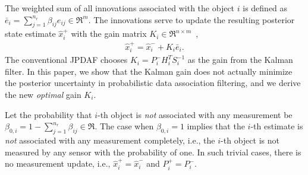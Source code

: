 The weighted sum of all innovations associated with the object $i$ is defined as ${\bar{e}}_{i}={\sum\limits_{j=1}^{n_r} \beta_{ij}e_{ij}}\in\Re^m$.
The innovations serve to update the resulting posterior state estimate $\hat x^+_{i}$ with the gain matrix $K_i\in\Re^{n\times m}$~\cite{TrackDataAssoc},
\begin{align}
\hat x^+_{i}= \hat x^-_{i}+K_{i}{\bar{e}}_{i}.\label{eqn:KalEst}
\end{align}
The conventional JPDAF chooses $K_i=P^-_iH_i^TS_i^{-1}$ as the gain from the Kalman filter.
In this paper, we show that the Kalman gain does not actually minimize the posterior uncertainty in probabilistic data association filtering, and we derive the new \textit{optimal} gain $K_i$.

Let the probability that $i$-th object is \textit{not} associated with any measurement be $\beta_{0,i}=1-{\sum_{j=1}^{n_r} \beta_{ij}}\in\Re$. The case when $\beta_{0,i}=1$ implies that the $i$-th estimate is \emph{not} associated with any measurement completely, i.e., the $i$-th object is not measured by any sensor with the probability of one. In such trivial cases, there is no measurement update, i.e., $\hat x^+_i=\hat x^-_i$ and $P_i^+=P_i^-$. 

